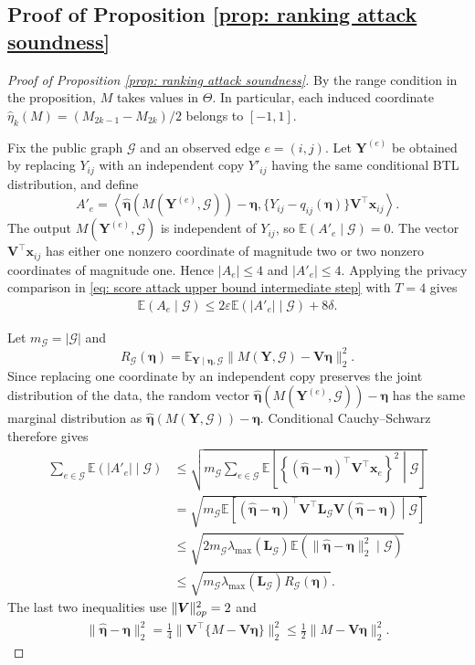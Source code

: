 \documentclass[letterpaper,12pt]{article}
\numberwithin{equation}{section}
\theoremstyle{plain}
\numberwithin{Theorem}{section}
\numberwithin{proposition}{section}
\numberwithin{Lemma}{section}
{
	\theoremstyle{definition}
	\newtheorem{Definition}{Definition}
	\newtheorem{example}{Example}
	\numberwithin{example}{section}
	\newtheorem{fact}{Fact}
	\numberwithin{fact}{section}
	\newtheorem{remark}{Remark}
}
\newcommand{\1}{\mathbbm{1}}
\def\E{\mathbb{E}}
\begin{document}
{
\subsection{Proof of Proposition \ref{prop: ranking attack soundness}}\label{sec: proof of prop: ranking attack soundness}
\begin{proof}[Proof of Proposition \ref{prop: ranking attack soundness}]
By the range condition in the proposition, $M$ takes values in $\Theta$. In particular, each induced coordinate $\widehat\eta_k(M)=(M_{2k-1}-M_{2k})/2$ belongs to $[-1,1]$.

Fix the public graph $\mathcal G$ and an observed edge $e=(i,j)$. Let $\bm Y^{(e)}$ be obtained by replacing $Y_{ij}$ with an independent copy $Y'_{ij}$ having the same conditional BTL distribution, and define
\[
A'_e=\left\langle\widehat{\bm\eta}(M(\bm Y^{(e)},\mathcal G))-\bm\eta,
\{Y_{ij}-q_{ij}(\bm\eta)\}\bm V^\top\bm x_{ij}\right\rangle.
\]
The output $M(\bm Y^{(e)},\mathcal G)$ is independent of $Y_{ij}$, so $\E(A'_e\mid\mathcal G)=0$. The vector $\bm V^\top\bm x_{ij}$ has either one nonzero coordinate of magnitude two or two nonzero coordinates of magnitude one. Hence $|A_e|\leq4$ and $|A'_e|\leq4$. Applying the privacy comparison in \eqref{eq: score attack upper bound intermediate step} with $T=4$ gives
\begin{align}\label{eq: ranking attack soundness privacy bound}
\E(A_e\mid\mathcal G)\leq2\varepsilon\E(|A'_e|\mid\mathcal G)+8\delta.
\end{align}

Let $m_{\mathcal G}=|\mathcal G|$ and
\[
R_{\mathcal G}(\bm\eta)=\E_{\bm Y\mid\bm\eta,\mathcal G}
\|M(\bm Y,\mathcal G)-\bm V\bm\eta\|_2^2.
\]
Since replacing one coordinate by an independent copy preserves the joint distribution of the data, the random vector
$\widehat{\bm\eta}(M(\bm Y^{(e)},\mathcal G))-\bm\eta$ has the same marginal distribution as
$\widehat{\bm\eta}(M(\bm Y,\mathcal G))-\bm\eta$. Conditional Cauchy--Schwarz therefore gives
\begin{align*}
\sum_{e\in\mathcal G}\E(|A'_e|\mid\mathcal G)
&\leq\sqrt{m_{\mathcal G}\sum_{e\in\mathcal G}
\E\left[\left\{(\widehat{\bm\eta}-\bm\eta)^\top\bm V^\top\bm x_e\right\}^2\middle|\mathcal G\right]}\\
&=\sqrt{m_{\mathcal G}\E\left[(\widehat{\bm\eta}-\bm\eta)^\top
\bm V^\top\bm L_{\mathcal G}\bm V(\widehat{\bm\eta}-\bm\eta)\middle|\mathcal G\right]}\\
&\leq\sqrt{2m_{\mathcal G}\lambda_{\max}(\bm L_{\mathcal G})
\E(\|\widehat{\bm\eta}-\bm\eta\|_2^2\mid\mathcal G)}\\
&\leq\sqrt{m_{\mathcal G}\lambda_{\max}(\bm L_{\mathcal G})R_{\mathcal G}(\bm\eta)}.
\end{align*}
The last two inequalities use $\|\bm V\|_{\rm op}^2=2$ and
\begin{align}\label{eq: ranking induced risk}
\|\widehat{\bm\eta}-\bm\eta\|_2^2
=\frac14\|\bm V^\top\{M-\bm V\bm\eta\}\|_2^2
\leq\frac12\|M-\bm V\bm\eta\|_2^2.
\end{align}


\end{proof}}
\end{document}
